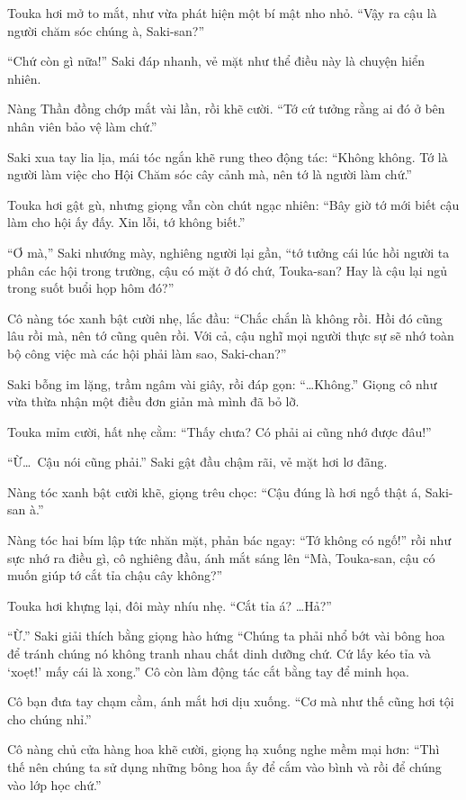 \documentclass[../main.tex]{subfiles}
\begin{document}
Touka hơi mở to mắt, như vừa phát hiện một bí mật nho nhỏ. ``Vậy ra cậu là người chăm sóc chúng à, Saki-san?''

``Chứ còn gì nữa!'' Saki đáp nhanh, vẻ mặt như thể điều này là chuyện hiển nhiên.

Nàng Thần đồng chớp mắt vài lần, rồi khẽ cười. ``Tớ cứ tưởng rằng ai đó ở bên nhân viên bảo vệ làm chứ.''

Saki xua tay lia lịa, mái tóc ngắn khẽ rung theo động tác: ``Không không. Tớ là người làm việc cho Hội Chăm sóc cây cảnh mà, nên tớ là người làm chứ.''

Touka hơi gật gù, nhưng giọng vẫn còn chút ngạc nhiên: ``Bây giờ tớ mới biết cậu làm cho hội ấy đấy. Xin lỗi, tớ không biết.''

``Ơ mà,'' Saki nhướng mày, nghiêng người lại gần, ``tớ tưởng cái lúc hồi người ta phân các hội trong trường, cậu có mặt ở đó chứ, Touka-san? Hay là cậu lại ngủ trong suốt buổi họp hôm đó?''

Cô nàng tóc xanh bật cười nhẹ, lắc đầu: ``Chắc chắn là không rồi. Hồi đó cũng lâu rồi mà, nên tớ cũng quên rồi. Với cả, cậu nghĩ mọi người thực sự sẽ nhớ toàn bộ công việc mà các hội phải làm sao, Saki-chan?''

Saki bỗng im lặng, trầm ngâm vài giây, rồi đáp gọn: ``\dots Không.'' Giọng cô như vừa thừa nhận một điều đơn giản mà mình đã bỏ lỡ.

Touka mỉm cười, hất nhẹ cằm: ``Thấy chưa? Có phải ai cũng nhớ được đâu!''

``Ừ\dots\ Cậu nói cũng phải.'' Saki gật đầu chậm rãi, vẻ mặt hơi lơ đãng.

Nàng tóc xanh bật cười khẽ, giọng trêu chọc: ``Cậu đúng là hơi ngố thật á, Saki-san à.''

Nàng tóc hai bím lập tức nhăn mặt, phản bác ngay: ``Tớ không có ngố!'' rồi như sực nhớ ra điều gì, cô nghiêng đầu, ánh mắt sáng lên ``Mà, Touka-san, cậu có muốn giúp tớ cắt tỉa chậu cây không?''

Touka hơi khựng lại, đôi mày nhíu nhẹ. ``Cắt tỉa á? \dots Hả?''

``Ừ.'' Saki giải thích bằng giọng hào hứng ``Chúng ta phải nhổ bớt vài bông hoa để tránh chúng nó không tranh nhau chất dinh dưỡng chứ. Cứ lấy kéo tỉa và `xoẹt!' mấy cái là xong.'' Cô còn làm động tác cắt bằng tay để minh họa.

Cô bạn đưa tay chạm cằm, ánh mắt hơi dịu xuống. ``Cơ mà như thế cũng hơi tội cho chúng nhỉ.''

Cô nàng chủ cửa hàng hoa khẽ cười, giọng hạ xuống nghe mềm mại hơn: ``Thì thế nên chúng ta sử dụng những bông hoa ấy để cắm vào bình và rồi để chúng vào lớp học chứ.''
\end{document}
